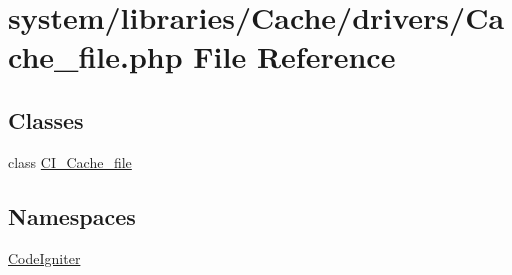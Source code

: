 \hypertarget{_cache__file_8php}{}\section{system/libraries/\+Cache/drivers/\+Cache\+\_\+file.php File Reference}
\label{_cache__file_8php}
\subsection*{Classes}
\begin{DoxyCompactItemize}
\item 
class \mbox{\hyperlink{class_c_i___cache__file}{C\+I\+\_\+\+Cache\+\_\+file}}
\end{DoxyCompactItemize}
\subsection*{Namespaces}
\begin{DoxyCompactItemize}
\item 
 \mbox{\hyperlink{namespace_code_igniter}{Code\+Igniter}}
\end{DoxyCompactItemize}
